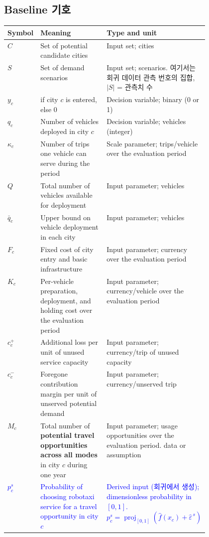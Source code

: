 \documentclass[10pt,a4paper]{article}
\begin{document}
\newpage
\subsection{\textbf{Baseline 기호}}

{\small
\begin{tabularx}{\linewidth}{@{}>{\raggedright\arraybackslash}p{0.1\linewidth}>{\raggedright\arraybackslash}p{0.37\linewidth}Y@{}}
\toprule
Symbol & Meaning & Type and unit \\ \midrule
$C$ & Set of potential candidate cities & Input set; cities \\
$S$ & Set of demand scenarios & Input set; scenarios. 여기서는 회귀 데이터 관측 번호의 집합, $|S|$ = 관측치 수 \\
$y_c$ & 1 if city $c$ is entered, else 0 & Decision variable; binary (0 or 1) \\
$q_c$ & Number of vehicles deployed in city $c$ & Decision variable; vehicles (integer) \\
$\kappa_c$ & Number of trips one vehicle can serve during the period & Scale parameter; trips/vehicle over the evaluation period \\
$Q$ & Total number of vehicles available for deployment & Input parameter; vehicles \\
$\bar q_c$ & Upper bound on vehicle deployment in each city & Input parameter; vehicles \\
$F_c$ & Fixed cost of city entry and basic infrastructure & Input parameter; currency over the evaluation period \\
$K_c$ & Per-vehicle preparation, deployment, and holding cost over the evaluation period & Input parameter; currency/vehicle over the evaluation period \\
$c_c^{+}$ & Additional loss per unit of unused service capacity & Input parameter; currency/trip of unused capacity \\
$c_c^{-}$ & Foregone contribution margin per unit of unserved potential demand & Input parameter; currency/unserved trip \\
$M_c$ & Total number of \textbf{potential travel opportunities across all modes}
in city $c$ during one year & Input parameter; usage opportunities over the evaluation period. data or assumption \\

\textcolor{blue}{$p_c^s$} & \textcolor{blue}{Probability of choosing robotaxi service for a travel opportunity
in city $c$} & \textcolor{blue}{Derived input (회귀에서 생성); dimensionless probability in $[0,1]$. $p_c^s=\operatorname{proj}_{[0,1]}(\hat f(x_c)+\hat\varepsilon^{\,s})$} \\


\end{tabularx}}
\end{document}
